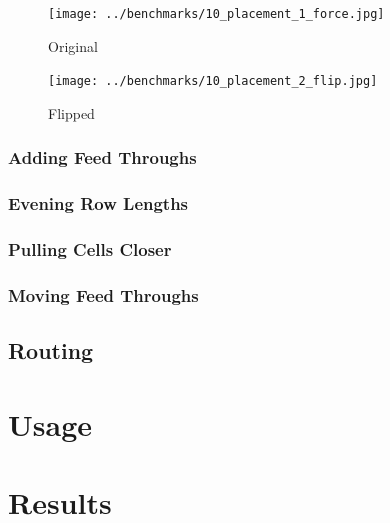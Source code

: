 \documentclass[10pt]{article}
\begin{document}
        \begin{figure}[H]
            \centering
            \texttt{[image: ../benchmarks/10\_placement\_1\_force.jpg]}
            \caption{Original}
        \end{figure}
        \begin{figure}[H]
            \centering
            \texttt{[image: ../benchmarks/10\_placement\_2\_flip.jpg]}
            \caption{Flipped}
        \end{figure}

        \subsubsection{Adding Feed Throughs}

        \subsubsection{Evening Row Lengths}

        \subsubsection{Pulling Cells Closer}

        \subsubsection{Moving Feed Throughs}


\subsection{Routing}

\newpage
\section{Usage}


\newpage
\section{Results}
\end{document}
